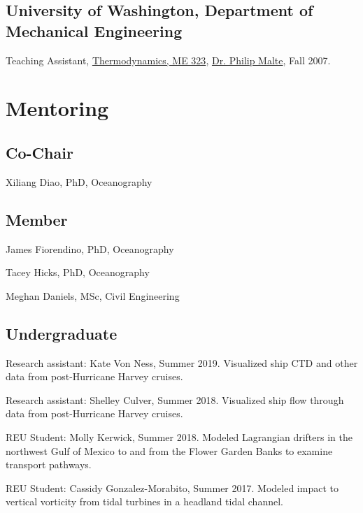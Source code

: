 \documentclass[10pt,letterpaper]{article}
\renewenvironment{itemize}{
  \begin{list}{}{
    \setlength{\leftmargin}{1.5em}
    \setlength{\itemsep}{0.25em}
    \setlength{\parskip}{0pt}
    \setlength{\parsep}{0.25em}
  }
}{
  \end{list}
}
\begin{document}
\subsection*{University of Washington, Department of Mechanical Engineering}

\begin{itemize}

\item Teaching Assistant,
  \href{http://www.washington.edu/students/crscat/meche.html#me323}{Thermodynamics, ME 323},
  \href{http://www.me.washington.edu/research/faculty/malte/}{Dr. Philip Malte},
  Fall 2007.

\end{itemize}



\section*{Mentoring}

\subsection*{Co-Chair}

\begin{itemize}
\item Xiliang Diao, PhD, Oceanography
\end{itemize}

\subsection*{Member}

\begin{itemize}
\item James Fiorendino, PhD, Oceanography
\item Tacey Hicks, PhD, Oceanography
\item Meghan Daniels, MSc, Civil Engineering
\end{itemize}

\subsection*{Undergraduate}

\begin{itemize}
\item Research assistant: Kate Von Ness, Summer 2019. Visualized ship CTD and other data from post-Hurricane Harvey cruises.
\item Research assistant: Shelley Culver, Summer 2018. Visualized ship flow through data from post-Hurricane Harvey cruises.
\item REU Student: Molly Kerwick, Summer 2018. Modeled Lagrangian drifters in the northwest Gulf of Mexico to and from the Flower Garden Banks to examine transport pathways.
\item REU Student: Cassidy Gonzalez-Morabito, Summer 2017. Modeled impact to vertical vorticity from tidal turbines in a headland tidal channel.
\end{itemize}
\end{document}
